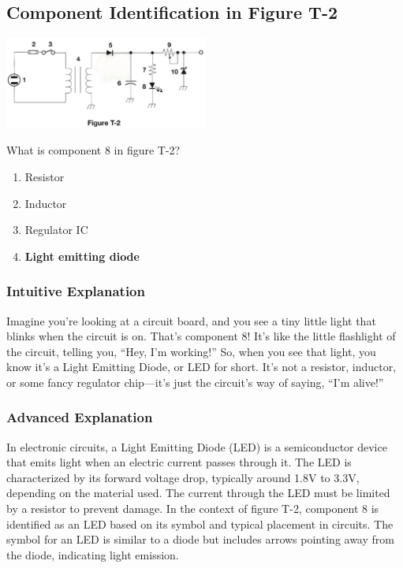 \subsection{Component Identification in Figure T-2}
\label{T6C07}

\begin{tcolorbox}[colback=gray!10!white,colframe=black!75!black,title=T6C07]
    \includegraphics[width=0.5\textwidth]{tech/images/t2.png} 

    What is component 8 in figure T-2?


\begin{enumerate}[label=\Alph*)]
    \item Resistor
    \item Inductor
    \item Regulator IC
    \item \textbf{Light emitting diode}
\end{enumerate}
\end{tcolorbox}

\subsubsection{Intuitive Explanation}
Imagine you’re looking at a circuit board, and you see a tiny little light that blinks when the circuit is on. That’s component 8! It’s like the little flashlight of the circuit, telling you, “Hey, I’m working!” So, when you see that light, you know it’s a Light Emitting Diode, or LED for short. It’s not a resistor, inductor, or some fancy regulator chip—it’s just the circuit’s way of saying, “I’m alive!”

\subsubsection{Advanced Explanation}
In electronic circuits, a Light Emitting Diode (LED) is a semiconductor device that emits light when an electric current passes through it. The LED is characterized by its forward voltage drop, typically around 1.8V to 3.3V, depending on the material used. The current through the LED must be limited by a resistor to prevent damage. In the context of figure T-2, component 8 is identified as an LED based on its symbol and typical placement in circuits. The symbol for an LED is similar to a diode but includes arrows pointing away from the diode, indicating light emission.

